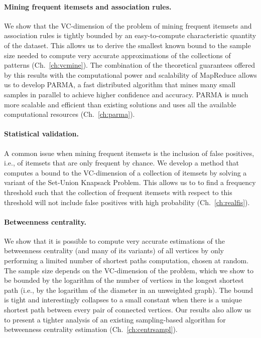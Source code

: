 \paragraph*{Mining frequent itemsets and association rules.} We show that the
VC-dimension of the problem of mining frequent itemsets and association rules is
tightly bounded by an easy-to-compute characteristic quantity of the dataset.
This allows us to derive the smallest known bound to the sample size needed to
compute very accurate approximations of the collections of patterns
(Ch.~\ref{ch:vcmine}). The combination of the theoretical guarantees offered by
this results with the computational power and scalability of MapReduce allows us
to develop PARMA, a fast distributed algorithm that mines many small samples in
parallel to achieve higher confidence and accuracy. PARMA
is much more scalable and efficient than existing solutions and uses all the
available computational resources (Ch.~\ref{ch:parma}). 

\paragraph*{Statistical validation.} A common issue when mining frequent
itemsets is the inclusion of false positives, i.e., of itemsets that are only
frequent by chance. We develop a method that computes a bound to the VC-dimension
of a collection of itemsets by solving a variant of the Set-Union Knapsack
Problem. This allows us to to find a frequency threshold such that the
collection of frequent itemsets with respect to this threshold will not include
false positives with high probability (Ch.~\ref{ch:realfis}).

\paragraph*{Betweenness centrality.} We show that it is possible to compute very
accurate estimations of the betweenness centrality (and many of its variants) of
all vertices by only performing a limited number of shortest paths computation,
chosen at random. The sample size depends on the VC-dimension of the problem,
which we show to be bounded by the logarithm of the number of vertices in the
longest shortest path (i.e., by the logarithm of the diameter in an unweighted
graph). The bound is tight and interestingly collapses to a small constant when
there is a unique shortest path between every pair of connected vertices. Our
results also allow us to present a tighter analysis of an existing
sampling-based algorithm for betweenness centrality estimation
(Ch.~\ref{ch:centrsampl}).

